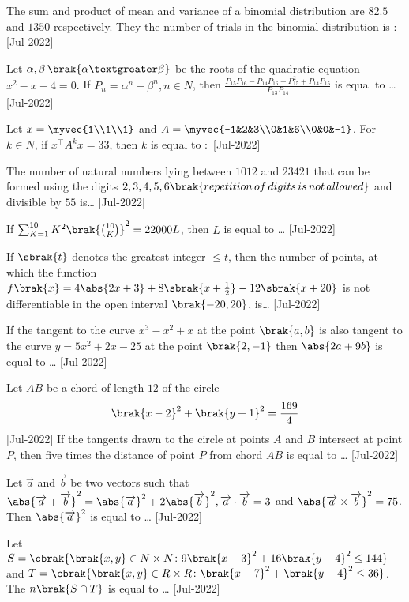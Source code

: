 \iffalse
    \title{2022}
    \author{EE24BTECH11021}
    \section{integer}
\fi
    \item The sum and product of mean and variance of a binomial distribution are $82.5$ and $1350$ respectively. They the number of trials in the binomial distribution is $\colon$
    \hfill{[Jul-2022]}
    \item Let $\alpha,\beta\,\brak{\alpha\textgreater\beta}$ be the roots of the quadratic equation $x^2-x-4=0.$ If $P_n=\alpha^n-\beta^n,n\in N$, then $\frac{P_{15}P_{16}-P_{14}P_{16}-P^2_{15}+P_{14}P_{15}}{P_{13}P_{14}}$ is equal to \dots
    \hfill{[Jul-2022]}
    \item Let $x=\myvec{1\\1\\1}$ and $A=\myvec{-1&2&3\\0&1&6\\0&0&-1}$. For $k\in N$, if $x^\top A^k x=33$, then $k$ is equal to $\colon$
    \hfill{[Jul-2022]}
    \item The number of natural numbers lying between $1012$ and $23421$ that can be formed using the digits $2,3,4,5,6\brak{repetition\,of\,digits\,is\,not\,allowed}$ and divisible by $55$ is\dots
    \hfill{[Jul-2022]}
    \item If $\sum_{K=1}^{10}K^2\brak{\binom{10}{K}}^2=22000L$, then $L$ is equal to \dots
    \hfill{[Jul-2022]}
    \item If $\sbrak{t}$ denotes the greatest integer $\leq t$, then the number of points, at which the function $f\brak{x}=4\abs{2x+3}+8\sbrak{x+\frac{1}{2}}-12\sbrak{x+20}$ is not differentiable in the open interval $\brak{-20,20}$, is\dots
    \hfill{[Jul-2022]}
    \item If the tangent to the curve $x^3-x^2+x$ at the point $\brak{a,b}$ is also tangent to the curve $y=5x^2+2x-25$ at the point $\brak{2,-1}$ then $\abs{2a+9b}$ is equal to \dots
    \hfill{[Jul-2022]}
    \item Let $AB$ be a chord of length $12$ of the circle $$\brak{x-2}^2+\brak{y+1}^2=\frac{169}{4}$$
    \hfill{[Jul-2022]}
    If the tangents drawn to the circle at points $A$ and $B$ intersect at point $P$, then five times the distance of point $P$ from chord $AB$ is equal to \dots
    \hfill{[Jul-2022]}
    \item Let $\overrightarrow{a}$ and $\overrightarrow{b}$ be two vectors such that $\abs{\overrightarrow{a}+\overrightarrow{b}}^2=\abs{\overrightarrow{a}}^2+2\abs{\overrightarrow{b}}^2,\overrightarrow{a}\cdot\overrightarrow{b}=3$ and $\abs{\overrightarrow{a}\times\overrightarrow{b}}^2=75$. Then $\abs{\overrightarrow{a}}^2$ is equal to \dots
    \hfill{[Jul-2022]}
    \item Let $S=\cbrak{\brak{x,y}\in N\times N\colon9\brak{x-3}^2+16\brak{y-4}^2\leq 144}$\\
    and $T=\cbrak{\brak{x,y}\in R\times R\colon\brak{x-7}^2+\brak{y-4}^2\leq 36}$.\\
    The $n\brak{S\cap T}$ is equal to \dots
    \hfill{[Jul-2022]}
